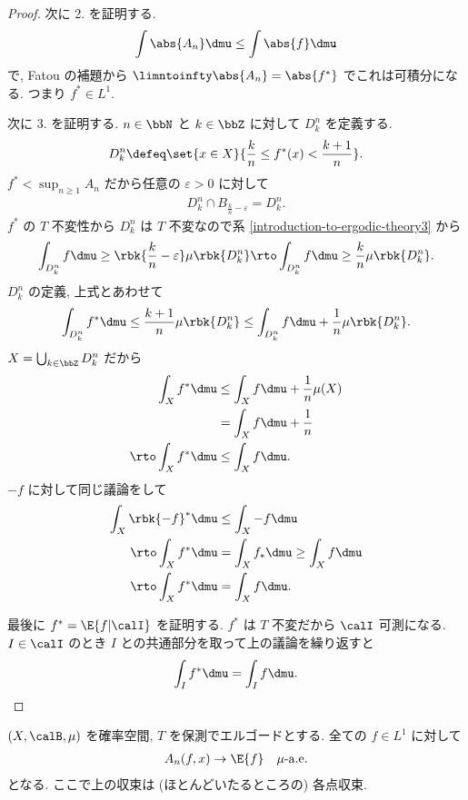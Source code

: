 \documentclass[openany, a4paper, oneside]{jsbook}
\begin{document}
\begin{proof}
次に 2. を証明する.
\begin{align}
 \int \abs{A_n} \dmu
 \leq
 \int \abs{f} \dmu
\end{align}
で, Fatou の補題から $\limntoinfty \abs{A_n} = \abs{f^*}$ でこれは可積分になる.
つまり $f^* \in L^1$.

次に 3. を証明する.
$n \in \bbN$ と $k \in \bbZ$ に対して $D_k^n$ を定義する.
\begin{align}
 D_{k}^n
 \defeq
 \set{x \in X}{\frac{k}{n} \leq f^* (x) < \frac{k+1}{n}}.
\end{align}
$f^* < \sup_{n \geq 1} A_n$ だから任意の $\varepsilon > 0$ に対して
\begin{align}
 D_k^n \cap B_{\frac{k}{n} - \varepsilon}
 =
 D_k^n.
\end{align}
$f^*$ の $T$ 不変性から $D_k^n$ は $T$ 不変なので系 \ref{introduction-to-ergodic-theory3} から
\begin{align}
 \int_{D_k^n} f \dmu
 \geq
 \rbk{\frac{k}{n} - \varepsilon} \mu \rbk{D_k^n}
 \rto
 \int_{D_k^n} f \dmu
 \geq
 \frac{k}{n} \mu \rbk{D_k^n}.
\end{align}
$D_k^n$ の定義, 上式とあわせて
\begin{align}
 \int_{D_k^n} f^* \dmu
 \leq
 \frac{k+1}{n} \mu \rbk{D_k^n}
 \leq
 \int_{D_k^n} f \dmu + \frac{1}{n} \mu \rbk{D_k^n}.
\end{align}
$X = \bigcup_{k \in \bbZ} D_k^n$ だから
\begin{align}
 \int_X f^* \dmu
 &\leq
 \int_X f \dmu + \frac{1}{n} \mu (X) \\
 &=
 \int_X f \dmu + \frac{1}{n} \\
 \rto
 \int_X f^* \dmu
 &\leq
 \int_X f \dmu.
\end{align}
$-f$ に対して同じ議論をして
\begin{align}
 \int_X \rbk{- f}^* \dmu
 &\leq
 \int_X -f \dmu \\
 \rto
 \int_X f^* \dmu
 &=
 \int_X f_* \dmu
 \geq
 \int_X f \dmu \\
 \rto
 \int_X f^* \dmu
 &=
 \int_X f \dmu.
\end{align}

最後に $f^* = \E{f | \calI}$ を証明する.
$f^*$ は $T$ 不変だから $\calI$ 可測になる.
$I \in \calI$ のとき $I$ との共通部分を取って上の議論を繰り返すと
\begin{align}
 \int_I f^* \dmu
 =
 \int_I f \dmu.
\end{align}
\end{proof}
\begin{cor}
$(X, \calB, \mu)$ を確率空間, $T$ を保測でエルゴードとする.
全ての $f \in L^1$ に対して
\begin{align}
 A_n (f, x)
 \to
 \E{f} \quad \mu\text{-a.e.}
\end{align}
となる.
ここで上の収束は (ほとんどいたるところの) 各点収束.
\end{cor}
\end{document}
